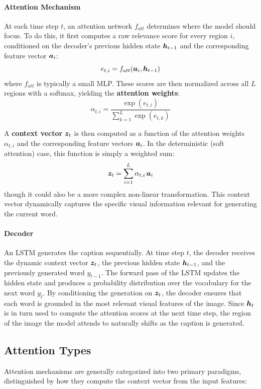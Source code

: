 \paragraph{Attention Mechanism}
At each time step $t$, an attention network $f_{att}$ determines where the model should focus.
To do this, it first computes a raw relevance score for every region $i$, conditioned on the decoder's previous hidden state $\boldsymbol{h}_{t-1}$ and the corresponding feature vector $\boldsymbol{a}_i$:
\[
e_{t,i} = f_{att}(\boldsymbol{a}_i, \boldsymbol{h}_{t-1})
\]
where $f_{att}$ is typically a small MLP. These scores are then normalized across all $L$ regions with a softmax, yielding the \textbf{attention weights}:
\[
\alpha_{t,i} = \frac{\exp(e_{t,i})}{\sum_{k=1}^{L} \exp(e_{t,k})}
\]

A \textbf{context vector} $\boldsymbol{z}_t$ is then computed as a function of the attention weights $\alpha_{t,i}$ and the corresponding feature vectors $\boldsymbol{a}_i$.
In the deterministic (soft attention) case, this function is simply a weighted sum:
\[
\boldsymbol{z}_t = \sum_{i=1}^{L} \alpha_{t,i} \, \boldsymbol{a}_i
\]
though it could also be a more complex non-linear transformation.
This context vector dynamically captures the specific visual information relevant for generating the current word.

\paragraph{Decoder}
An LSTM generates the caption sequentially.
At time step $t$, the decoder receives the dynamic context vector $\boldsymbol{z}_t$, the previous hidden state $\boldsymbol{h}_{t-1}$, and the previously generated word $y_{t-1}$.
The forward pass of the LSTM updates the hidden state and produces a probability distribution over the vocabulary for the next word $y_t$.
By conditioning the generation on $\boldsymbol{z}_t$, the decoder ensures that each word is grounded in the most relevant visual features of the image.
Since $\boldsymbol{h}_t$ is in turn used to compute the attention scores at the next time step, the region of the image the model attends to naturally shifts as the caption is generated.


\subsection{Attention Types}

Attention mechanisms are generally categorized into two primary paradigms, distinguished by how they compute the context vector from the input features:


